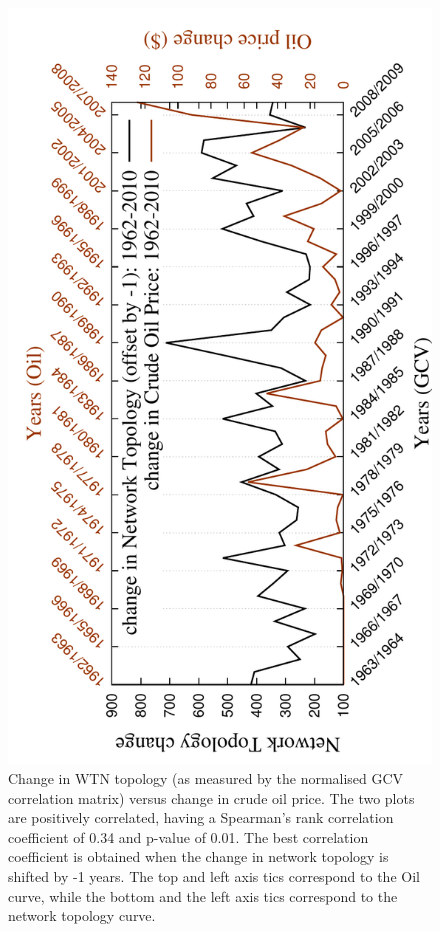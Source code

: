 \begin{figure}[H]
  \centering
\includegraphics[angle=-90,scale=0.6]{../code/final_results_norm1/all_trade_thresh/change_over_time2}
\caption[Change in WTN topology - normalised GCV]{Change in WTN topology (as measured by the normalised GCV correlation matrix) versus change in crude oil price. The two plots are positively correlated, having a Spearman's rank correlation coefficient of 0.34 and p-value of 0.01. The best correlation coefficient is obtained when the change in network topology is shifted by -1 years. The top and left axis tics correspond to the Oil curve, while the bottom and the left axis tics correspond to the network topology curve.}
\label{change_over_time_norm1}
\end{figure}

